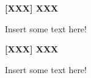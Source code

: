 \documentclass[a4paper,12pt,english]{scrartcl}
\newcommand{\papertitle}[2]{
	\noindent
	\textbf{\textsf{{\large
		[#1] #2
	}}}
	\vspace{2mm}
}
\begin{document}
\pagestyle{fancy} %

\papertitle{XXX}{XXX}

Insert some text here!

\vspace{8mm}

\papertitle{XXX}{XXX}

Insert some text here!
\end{document}
